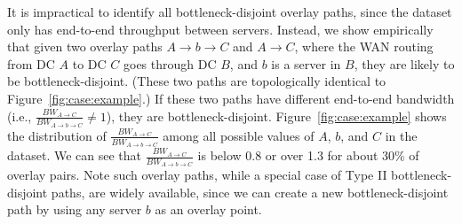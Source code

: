 It is impractical to identify all bottleneck-disjoint overlay paths,
since the dataset only has end-to-end throughput between
servers.
Instead, we show empirically that given two overlay
paths $A$$\rightarrow$$b\rightarrow$$C$ and $A$$\rightarrow$$C$,
where the WAN routing from DC $A$ to DC $C$ goes through DC $B$,
and $b$ is a server in $B$, they are likely to be
bottleneck-disjoint.
(These two paths are topologically identical to
Figure~\ref{fig:case:example}.)
If these two paths have different end-to-end bandwidth
(i.e., $\frac{BW_{A\rightarrow C}}{BW_{A\rightarrow b\rightarrow C}}\neq1$),
they are bottleneck-disjoint.
Figure~\ref{fig:case:example} shows the distribution of
$\frac{BW_{A\rightarrow C}}{BW_{A\rightarrow b\rightarrow C}}$
among all possible values of $A$, $b$, and $C$ in the dataset.
We can see that $\frac{BW_{A\rightarrow C}}{BW_{A\rightarrow b\rightarrow C}}$ is
below 0.8 or over 1.3 for about 30\% of overlay pairs.
Note such overlay paths, while a special case of Type II
bottleneck-disjoint paths, are widely available, since we can
create a new bottleneck-disjoint path by using any server $b$
as an overlay point.



